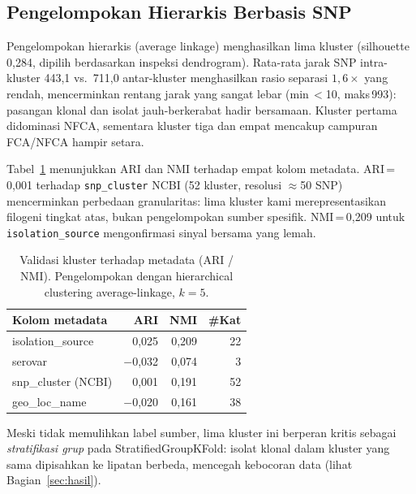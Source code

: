 \documentclass{article}
\begin{document}
\subsection{Pengelompokan Hierarkis Berbasis SNP}

Pengelompokan hierarkis (average linkage) menghasilkan lima kluster
(silhouette 0,284, dipilih berdasarkan inspeksi dendrogram). Rata-rata jarak
SNP intra-kluster 443,1 vs.\ 711,0 antar-kluster menghasilkan rasio separasi
$1{,}6\times$ yang rendah, mencerminkan rentang jarak yang sangat lebar
(min\,$<$10, maks\,993): pasangan klonal dan isolat jauh-berkerabat hadir
bersamaan. Kluster pertama didominasi NFCA, sementara kluster tiga dan empat
mencakup campuran FCA/NFCA hampir setara.

Tabel~\ref{tab:clustering} menunjukkan ARI dan NMI terhadap empat kolom
metadata. ARI\,=\,0,001 terhadap \texttt{snp\_cluster} NCBI (52 kluster,
resolusi $\approx$50 SNP) mencerminkan perbedaan granularitas: lima kluster
kami merepresentasikan filogeni tingkat atas, bukan pengelompokan sumber
spesifik. NMI\,=\,0,209 untuk \texttt{isolation\_source} mengonfirmasi sinyal
bersama yang lemah.

\begin{table}[t]
  \caption{Validasi kluster terhadap metadata (ARI / NMI). Pengelompokan
    dengan hierarchical clustering average-linkage, $k\!=\!5$.}
  \label{tab:clustering}
  \begin{center}
    \begin{small}
      \begin{tabular}{lrrr}
        \toprule
        Kolom metadata       & ARI      & NMI    & \#Kat \\
        \midrule
        isolation\_source    & 0,025    & 0,209  & 22    \\
        serovar              & $-$0,032 & 0,074  & 3     \\
        snp\_cluster (NCBI)  & 0,001    & 0,191  & 52    \\
        geo\_loc\_name       & $-$0,020 & 0,161  & 38    \\
        \bottomrule
      \end{tabular}
    \end{small}
  \end{center}
  \vskip -0.1in
\end{table}

Meski tidak memulihkan label sumber, lima kluster ini berperan kritis sebagai
\textit{stratifikasi grup} pada StratifiedGroupKFold: isolat klonal dalam
kluster yang sama dipisahkan ke lipatan berbeda, mencegah kebocoran data
(lihat Bagian~\ref{sec:hasil}).
\end{document}
